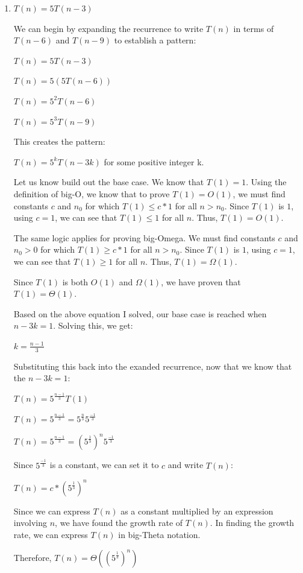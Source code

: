 \documentclass[11pt]{article}
\begin{document}
\begin{enumerate}
\item $T(n) = 5 T(n-3)$

We can begin by expanding the recurrence to write $T(n)$ in terms of $T(n-6)$ and $T(n-9)$ to establish a pattern:

$T(n) = 5 T(n-3)$

$T(n) = 5 (5 T(n-6))$

$T(n) = 5^2 T(n-6)$

$T(n) = 5^3 T(n-9)$

This creates the pattern:

$T(n) = 5^k T(n-3k)$ for some positive integer k.

Let us know build out the base case. 
We know that $T(1) = 1$. 
Using the definition of big-O, we know that to prove $T(1) = O(1)$, we must find constants $c$ and $n_0$ for which $T(1) \leq c*1$ for all $n > n_0$. 
Since $T(1)$ is $1$, using $c=1$, we can see that $T(1) \leq 1$ for all $n$. Thus, $T(1) = O(1)$.

The same logic applies for proving big-Omega. We must find constants $c$ and $n_0 > 0$ for which $T(1) \geq c*1$ for all $n > n_0$. 
Since $T(1)$ is $1$, using $c=1$, we can see that $T(1) \geq 1$ for all $n$. Thus, $T(1) = \Omega(1)$.

Since $T(1)$ is both $O(1)$ and $\Omega(1)$, we have proven that $T(1) = \Theta(1)$.

Based on the above equation I solved, our base case is reached when $n-3k = 1$. Solving this, we get:

$k = \frac{n-1}{3}$

Substituting this back into the exanded recurrence, now that we know that the $n-3k = 1$:

$T(n) = 5^{\frac{n-1}{3}} T(1)$

$T(n) = 5^{\frac{n-1}{3}} = 5^{\frac{n}{3}} 5^{\frac{-1}{3}}$

$T(n) = 5^{\frac{n-1}{3}} = (5^{\frac{1}{3}})^{n} 5^{\frac{-1}{3}}$

Since $5^{\frac{-1}{3}}$ is a constant, we can set it to $c$ and write $T(n)$:

$T(n) = c * (5^{\frac{1}{3}})^{n}$

Since we can express $T(n)$ as a constant multiplied by an expression involving $n$, we have found the growth rate of $T(n)$. 
In finding the growth rate, we can express $T(n)$ in big-Theta notation.

Therefore, $T(n) = \Theta ((5^{\frac{1}{3}})^{n})$


\end{enumerate}
\end{document}

